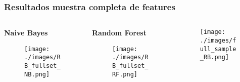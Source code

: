 \documentclass[10pt]{beamer}
\begin{document}
\begin{frame}[c, squeeze] \frametitle{Resultados muestra completa de features}
\begin{columns}
\begin{column}{0.3\textwidth}
\begin{center}
\textbf{Naive Bayes} 
\begin{figure}
 \texttt{[image: ./images/RB\_fullset\_NB.png]}
\end{figure}
\end{center}
\end{column}
\begin{column}{0.3\textwidth}
\begin{center}
\textbf{Random Forest}
\begin{figure}
 \texttt{[image: ./images/RB\_fullset\_RF.png]}
\end{figure}
\end{center}
\end{column}
\begin{column}{0.34\textwidth}
 \begin{figure}
 \texttt{[image: ./images/full\_sample\_RB.png]}
\end{figure}
\end{column}
\end{columns}
\end{frame}
\end{document}
